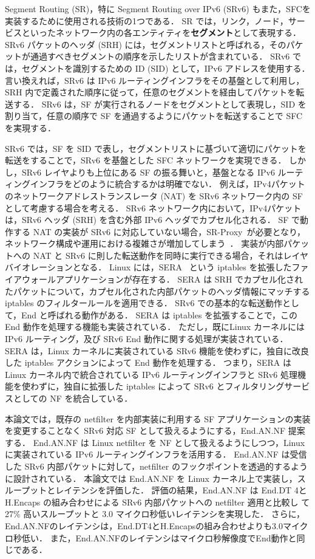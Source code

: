 Segment Routing (SR)，特に Segment Routing over IPv6 (SRv6) もまた，SFCを実装するために使用される技術の1つである．
SR では，リンク，ノード，サービスといったネットワーク内の各エンティティを\textbf{セグメント}として表現する．
SRv6 パケットのヘッダ (SRH) には，セグメントリストと呼ばれる，そのパケットが通過すべきセグメントの順序を示したリストが含まれている．
SRv6 では，セグメントを識別するための ID (SID) として，IPv6 アドレスを使用する．
言い換えれば，SRv6 は IPv6 ルーティングインフラをその基盤として利用し，SRH 内で定義された順序に従って，任意のセグメントを経由してパケットを転送する．
SRv6 は，SF が実行されるノードをセグメントとして表現し，SID を割り当て，任意の順序で SF を通過するようにパケットを転送することで SFC を実現する．

SRv6 では，SF を SID で表し，セグメントリストに基づいて適切にパケットを転送をすることで，SRv6 を基盤とした SFC ネットワークを実現できる．
しかし，SRv6 レイヤよりも上位にある SF の振る舞いと，基盤となる IPv6 ルーティングインフラをどのように統合するかは明確でない．
例えば，IPv4パケットのネットワークアドレストランスレータ (NAT) を SRv6 ネットワーク内の SF として考慮する場合を考える．
SRv6 ネットワーク内において，IPv4パケットは，SRv6 ヘッダ (SRH) を含む外部 IPv6 ヘッダでカプセル化される．
SF で動作する NAT の実装が SRv6 に対応していない場合，SR-Proxy~\cite{ietf-spring-sr-service-programming-08}が必要となり，ネットワーク構成や運用における複雑さが増加してしまう~\cite{draft-scexp}．
実装が内部パケットへの NAT と SRv6 に則した転送動作を同時に実行できる場合，それはレイヤバイオレーションとなる． 
Linux には，SERA~\cite{sera} という iptables を拡張したファイアウォールアプリケーションが存在する．
SERA は SRH でカプセル化されたパケットについて，カプセル化された内部パケットのヘッダ情報にマッチする iptables のフィルタールールを適用できる．
SRv6 での基本的な転送動作として，End と呼ばれる動作がある．
SERA は iptables を拡張することで，この End 動作を処理する機能も実装されている．
ただし，既にLinux カーネルには IPv6 ルーティング，及び SRv6 End 動作に関する処理が実装されている．
SERA は，Linux カーネルに実装されている SRv6 機能を使わずに，独自に改良した iptables アクションによって End 動作を処理する．
つまり，SERA は Linux カーネル内で統合されている IPv6 ルーティングインフラと SRv6 処理機能を使わずに，独自に拡張した iptables によって SRv6 とフィルタリングサービスとしての NF を統合している．

本論文では，既存の netfilter を内部実装に利用する SF アプリケーションの実装を変更することなく SRv6 対応 SF として扱えるようにする，End.AN.NF 提案する．
End.AN.NF は Linux netfilter を NF として扱えるようにしつつ，Linux に実装されている IPv6 ルーティングインフラを活用する．
End.AN.NF は受信した SRv6 内部パケットに対して，netfilter のフックポイントを透過的するように設計されている．
本論文では End.AN.NF を Linux カーネル上で実装し，スループットとレイテンシを評価した．
評価の結果，End.AN.NF は End.DT 4と H.Encaps の組み合わせによる SRv6 内部パケットへの netfilter 適用と比較し て27\% 高いスループットと 3.0 マイクロ秒低いレイテンシを実現した．
さらに，End.AN.NFのレイテンシは，End.DT4とH.Encapsの組み合わせよりも3.0マイクロ秒低い．
また，End.AN.NFのレイテンシはマイクロ秒解像度でEnd動作と同じである．

